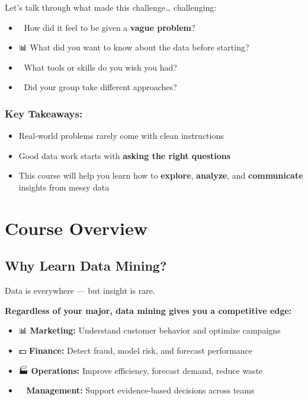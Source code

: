 \documentclass[
  letterpaper,
  DIV=11,
  numbers=noendperiod]{scrartcl}
\providecommand{\tightlist}{%
  \setlength{\itemsep}{0pt}\setlength{\parskip}{0pt}}
\begin{document}
Let's talk through what made this challenge\ldots{} challenging:

\begin{itemize}
\tightlist
\item
  🧭 How did it feel to be given a \textbf{vague problem}?
\item
  📊 What did you want to know about the data before starting?
\item
  🧠 What tools or skills do you wish you had?
\item
  💬 Did your group take different approaches?
\end{itemize}

\subsubsection{Key Takeaways:}\label{key-takeaways}

\begin{itemize}
\tightlist
\item
  Real-world problems rarely come with clean instructions
\item
  Good data work starts with \textbf{asking the right questions}
\item
  This course will help you learn how to \textbf{explore},
  \textbf{analyze}, and \textbf{communicate} insights from messy data
\end{itemize}

\section{Course Overview}\label{course-overview}

\subsection{Why Learn Data Mining?}\label{why-learn-data-mining}

Data is everywhere --- but insight is rare.

\textbf{Regardless of your major, data mining gives you a competitive
edge:}

\begin{itemize}
\tightlist
\item
  📊 \textbf{Marketing:} Understand customer behavior and optimize
  campaigns
\item
  💵 \textbf{Finance:} Detect fraud, model risk, and forecast
  performance
\item
  🏭 \textbf{Operations:} Improve efficiency, forecast demand, reduce
  waste
\item
  👩‍💼 \textbf{Management:} Support evidence-based decisions across teams
\end{itemize}
\end{document}
